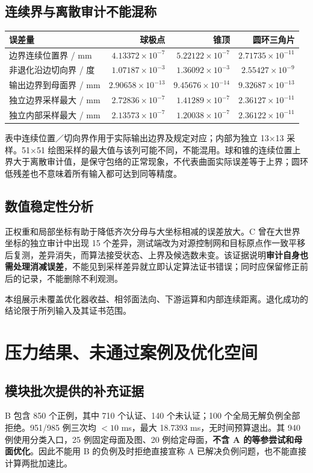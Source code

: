 \documentclass[UTF8,zihao=5,fontset=windows,a4paper]{ctexart}
\begin{document}
\subsection{连续界与离散审计不能混称}
\begin{center}\small\renewcommand{\arraystretch}{1.23}
\begin{tabularx}{\linewidth}{@{}Yrrr@{}}\toprule
误差量 & 球极点 & 锥顶 & 圆环三角片\\\midrule
边界连续位置界 / mm & $4.13372\!\times\!10^{-7}$ & $5.22122\!\times\!10^{-7}$ & $2.71735\!\times\!10^{-11}$\\
非退化沿边切向界 / 度 & $1.07187\!\times\!10^{-3}$ & $1.36092\!\times\!10^{-3}$ & $2.55427\!\times\!10^{-9}$\\
输出边界到母面界 / mm & $2.90658\!\times\!10^{-13}$ & $9.45676\!\times\!10^{-14}$ & $9.32687\!\times\!10^{-13}$\\
独立边界采样最大 / mm & $2.72836\!\times\!10^{-7}$ & $1.41289\!\times\!10^{-7}$ & $2.36127\!\times\!10^{-11}$\\
独立内部采样最大 / mm & $2.13573\!\times\!10^{-7}$ & $1.20038\!\times\!10^{-7}$ & $2.36122\!\times\!10^{-11}$\\\bottomrule
\end{tabularx}
\end{center}
表中连续位置／切向界作用于实际输出边界及规定对应；内部为独立 13×13 采样。51×51 绘图采样的最大值与该列可能不同，不能混用。球和锥的连续位置上界大于离散审计值，是保守包络的正常现象，不代表曲面实际误差等于上界；圆环低残差也不意味着所有输入都可达到同等精度。

\subsection{数值稳定性分析}
正权重和局部坐标有助于降低齐次分母与大坐标相减的误差放大。C 曾在大世界坐标的独立审计中出现 15 个差异，测试端改为对源控制网和目标原点作一致平移后复测，差异消失，而算法接受状态、上界及候选数未变。该证据说明\textbf{审计自身也需处理消减误差}，不能见到采样差异就立即认定算法证书错误；同时应保留修正前后的记录，不能删除不利观测。

本组展示未覆盖优化器收益、相邻面法向、下游运算和内部连续距离。退化成功的结论限于所列输入及其证书范围。

\newpage
\section{压力结果、未通过案例及优化空间}
\subsection{模块批次提供的补充证据}
B 包含 850 个正例，其中 710 个认证、140 个未认证；100 个全局无解负例全部拒绝。951/985 例三次均 $<10$ ms，最大 18.7393 ms，无时间预算退出。其 940 例使用分类入口，25 例固定母面及图、20 例给定母面，\textbf{不含 A 的等参尝试和母面优化}。因此不能用 B 的负例及时拒绝直接宣称 A 已解决负例问题，也不能直接计算两批加速比。
\end{document}
